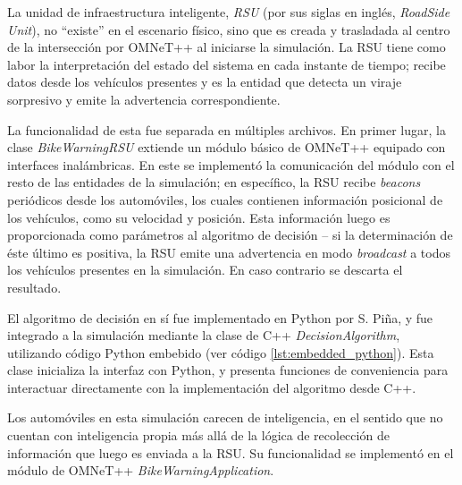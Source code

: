 \documentclass[11pt,letterpaper]{article}
\begin{document}
\begin{description}[leftmargin=!,labelwidth=\widthof{\bfseries Automóviles}]
	\item [RSU]	La unidad de infraestructura inteligente, \emph{RSU} (por sus siglas en inglés, \emph{RoadSide Unit}), no ``existe'' en el escenario físico, sino que es creada y trasladada al centro de la intersección por OMNeT++ al iniciarse la simulación. La RSU tiene como labor la interpretación del estado del sistema en cada instante de tiempo; recibe datos desde los vehículos presentes y es la entidad que detecta un viraje sorpresivo y emite la advertencia correspondiente.

	La funcionalidad de esta fue separada en múltiples archivos. En primer lugar, la clase \emph{BikeWarningRSU} extiende un módulo básico de OMNeT++ equipado con interfaces inalámbricas. En este se implementó la comunicación del módulo con el resto de las entidades de la simulación; en específico, la RSU recibe \emph{beacons} periódicos desde los automóviles, los cuales contienen información posicional de los vehículos, como su velocidad y posición. Esta información luego es proporcionada como parámetros al algoritmo de decisión -- si la determinación de éste último es positiva, la RSU emite una advertencia en modo \emph{broadcast} a todos los vehículos presentes en la simulación. En caso contrario se descarta el resultado.

	El algoritmo de decisión en sí fue implementado en Python por S. Piña, y fue integrado a la simulación mediante la clase de C++ \emph{DecisionAlgorithm}, utilizando código Python embebido (ver código \ref{lst:embedded_python}). Esta clase inicializa la interfaz con Python, y presenta funciones de conveniencia para interactuar directamente con la implementación del algoritmo desde C++.

	\item [Automóviles]	Los automóviles en esta simulación carecen de inteligencia, en el sentido que no cuentan con inteligencia propia más allá de la lógica de recolección de información que luego es enviada a la RSU. Su funcionalidad se implementó en el módulo de OMNeT++ \emph{BikeWarningApplication}.


\end{description}
\end{document}
